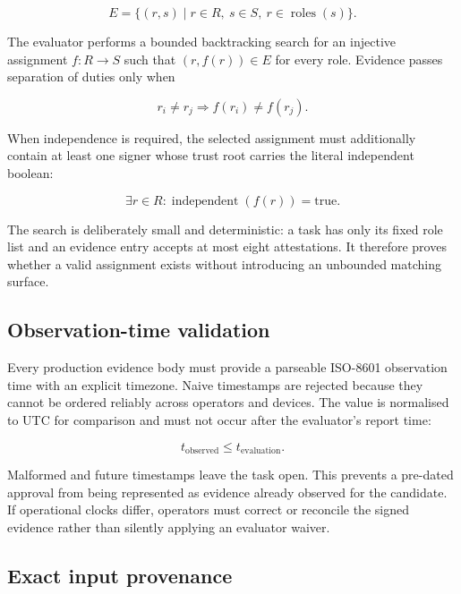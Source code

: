 \begin{equation}
  E = \{(r,s)\mid r\in R,\ s\in S,\ r\in\operatorname{roles}(s)\}.
\end{equation}

The evaluator performs a bounded backtracking search for an injective assignment
$f:R\rightarrow S$ such that $(r,f(r))\in E$ for every role.  Evidence passes
separation of duties only when

\begin{equation}
  r_i \neq r_j \Longrightarrow f(r_i) \neq f(r_j).
\end{equation}

When independence is required, the selected assignment must additionally contain
at least one signer whose trust root carries the literal independent boolean:

\begin{equation}
  \exists r\in R:\operatorname{independent}(f(r))=\mathrm{true}.
\end{equation}

The search is deliberately small and deterministic: a task has only its fixed
role list and an evidence entry accepts at most eight attestations.  It therefore
proves whether a valid assignment exists without introducing an unbounded matching
surface.

\subsection{Observation-time validation}

Every production evidence body must provide a parseable ISO-8601 observation time
with an explicit timezone.  Naive timestamps are rejected because they cannot be
ordered reliably across operators and devices.  The value is normalised to UTC
for comparison and must not occur after the evaluator's report time:

\begin{equation}
  t_{\mathrm{observed}} \leq t_{\mathrm{evaluation}}.
\end{equation}

Malformed and future timestamps leave the task open.  This prevents a pre-dated
approval from being represented as evidence already observed for the candidate.
If operational clocks differ, operators must correct or reconcile the signed
evidence rather than silently applying an evaluator waiver.

\subsection{Exact input provenance}

